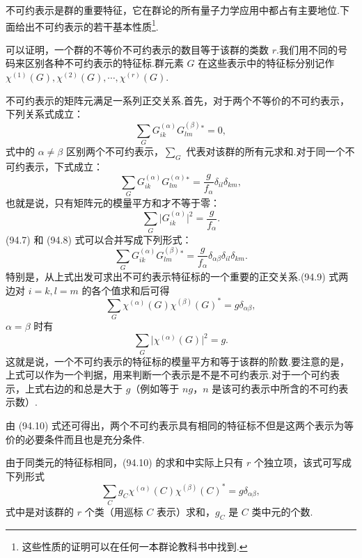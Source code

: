 不可约表示是群的重要特征，它在群论的所有量子力学应用中都占有主要地位.下面给出不可约表示的若干基本性质\footnote{这些性质的证明可以在任何一本群论教科书中找到.}.

可以证明，一个群的不等价不可约表示的数目等于该群的类数 $r$.我们用不同的号码来区别各种不可约表示的特征标.群元素 $G$ 在这些表示中的特征标分别记作 $\chi^{(1)}(G),\chi^{(2)}(G),\cdots,\chi^{(r)}(G)$.

不可约表示的矩阵元满足一系列正交关系.首先，对于两个不等价的不可约表示，下列关系式成立：
\begin{equation}
  \sum_G G_{ik}^{(\alpha)}G_{lm}^{(\beta)}{}^{*}=0,
\end{equation}
式中的 $\alpha\neq\beta$ 区别两个不可约表示，$\sum_G$ 代表对该群的所有元求和.对于同一个不可约表示，下式成立：
\begin{equation}
  \sum_G G_{ik}^{(\alpha)}G_{lm}^{(\alpha)}{}^{*}
  =\frac{g}{f_\alpha}\delta_{il}\delta_{km},
\end{equation}
也就是说，只有矩阵元的模量平方和才不等于零：
\begin{equation*}
  \sum_G\bigl|G_{ik}^{(\alpha)}\bigr|^2=\frac{g}{f_\alpha}.
\end{equation*}
(94.7) 和 (94.8) 式可以合并写成下列形式：
\begin{equation}
  \sum_G G_{ik}^{(\alpha)}G_{lm}^{(\beta)}{}^{*}
  =\frac{g}{f_\alpha}\delta_{\alpha\beta}\delta_{il}\delta_{km}.
\end{equation}
特别是，从上式出发可求出不可约表示特征标的一个重要的正交关系.(94.9) 式两边对 $i=k,l=m$ 的各个值求和后可得
\begin{equation}
  \sum_G\chi^{(\alpha)}(G)\chi^{(\beta)}(G)^{*}=g\delta_{\alpha\beta},
\end{equation}
$\alpha=\beta$ 时有
\begin{equation*}
  \sum_G\bigl|\chi^{(\alpha)}(G)\bigr|^2=g.
\end{equation*}
这就是说，一个不可约表示的特征标的模量平方和等于该群的阶数.要注意的是，上式可以作为一个判据，用来判断一个表示是不是不可约表示.对于一个可约表示，上式右边的和总是大于 $g$（例如等于 $ng$，$n$ 是该可约表示中所含的不可约表示数）.

由 (94.10) 式还可得出，两个不可约表示具有相同的特征标不但是这两个表示为等价的必要条件而且也是充分条件.

由于同类元的特征标相同，(94.10) 的求和中实际上只有 $r$ 个独立项，该式可写成下列形式
\begin{equation}
  \sum_C g_C\chi^{(\alpha)}(C)\chi^{(\beta)}(C)^{*}=g\delta_{\alpha\beta},
\end{equation}
式中是对该群的 $r$ 个类（用巡标 $C$ 表示）求和，$g_C$ 是 $C$ 类中元的个数.

